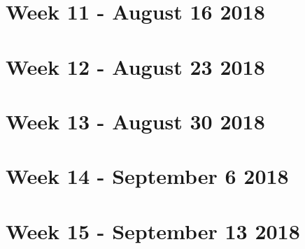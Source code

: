 \documentclass[a4paper]{report}
\begin{document}
\chapter{Week 11 - August 16 2018}


\chapter{Week 12 - August 23 2018}


\chapter{Week 13 - August 30 2018}


\chapter{Week 14 - September 6 2018}


\chapter{Week 15 - September 13 2018}



\end{document}
